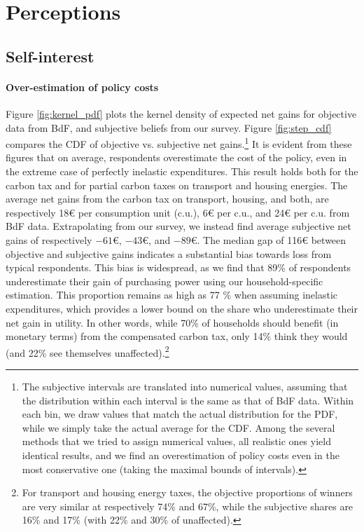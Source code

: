 \documentclass[11pt]{article}
\begin{document}
\section{Perceptions}\label{sec:perceptions}

    \subsection{Self-interest}\label{subsec:perc_si}

\paragraph{Over-estimation of policy costs}
Figure \ref{fig:kernel_pdf} plots the kernel density of expected net gains for objective data from BdF, and subjective beliefs from our survey. Figure \ref{fig:step_cdf} compares the CDF of objective vs. subjective net gains.\footnote{The subjective intervals are translated into numerical values, assuming that the distribution within each interval is the same as that of BdF data. Within each bin, we draw values that match the actual distribution for the PDF, while we simply take the actual average for the CDF. Among the several methods that we tried to assign numerical values, all realistic ones yield identical results, and we find an overestimation of policy costs even in the most conservative one (taking the maximal bounds of intervals).} It is evident from these figures that on average, respondents overestimate the cost of the policy, even in the extreme case of perfectly inelastic expenditures. This result holds both for the carbon tax and for partial carbon taxes on transport and housing energies. The average net gains from the carbon tax on transport, housing, and both, are respectively 18\euro{} per consumption unit (c.u.), 6\euro{} per c.u., and 24\euro{} per c.u. from BdF data. Extrapolating from our survey, we instead find average subjective net gains of respectively $-61$\euro{}, $-43$\euro{}, and $-89$\euro{}. The median gap of 116\euro{} between objective and subjective gains indicates a substantial bias towards loss from typical respondents. This bias is widespread, as we find that 89\% of respondents underestimate their gain of purchasing power using our household-specific estimation. This proportion remains as high as 77 \% when assuming inelastic expenditures, which provides a lower bound on the share who underestimate their net gain in utility. In other words, while 70\% of households should benefit (in monetary terms) from the compensated carbon tax, only 14\% think they would (and 22\% see themselves unaffected).\footnote{For transport and housing energy taxes, the objective proportions of winners are very similar at respectively 74\% and 67\%, while the subjective shares are 16\% and 17\% (with 22\% and 30\% of unaffected).}
\end{document}
